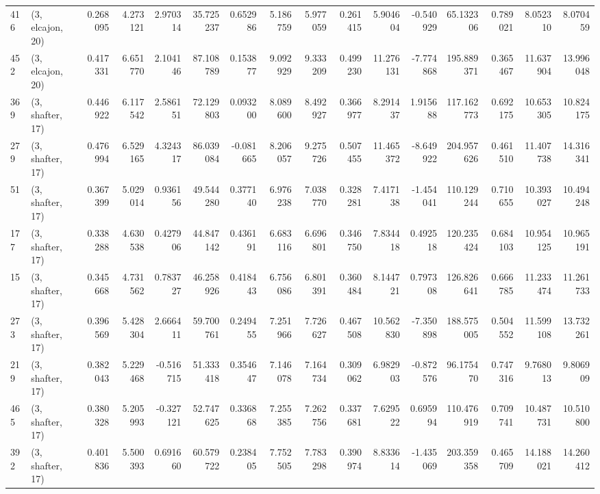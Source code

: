 \begin{tabular}{llrrrrrrrrrrrrrr}
416 &  (3, elcajon, 20) &   0.268095 &   4.273121 &   2.970314 &    35.725237 &   0.652986 &   5.186759 &   5.977059 &  0.261415 &   5.904604 &  -0.540929 &    65.132306 &  0.789021 &   8.052310 &   8.070459 \\
452 &  (3, elcajon, 20) &   0.417331 &   6.651770 &   2.104146 &    87.108789 &   0.153877 &   9.092929 &   9.333209 &  0.499230 &  11.276131 &  -7.774868 &   195.889371 &  0.365467 &  11.637904 &  13.996048 \\
369 &  (3, shafter, 17) &   0.446922 &   6.117542 &   2.586151 &    72.129803 &   0.093200 &   8.089600 &   8.492927 &  0.366977 &   8.291437 &   1.915688 &   117.162773 &  0.692175 &  10.653305 &  10.824175 \\
279 &  (3, shafter, 17) &   0.476994 &   6.529165 &   4.324317 &    86.039084 &  -0.081665 &   8.206057 &   9.275726 &  0.507455 &  11.465372 &  -8.649922 &   204.957626 &  0.461510 &  11.407738 &  14.316341 \\
51  &  (3, shafter, 17) &   0.367399 &   5.029014 &   0.936156 &    49.544280 &   0.377140 &   6.976238 &   7.038770 &  0.328281 &   7.417138 &  -1.454041 &   110.129244 &  0.710655 &  10.393027 &  10.494248 \\
177 &  (3, shafter, 17) &   0.338288 &   4.630538 &   0.427906 &    44.847142 &   0.436191 &   6.683116 &   6.696801 &  0.346750 &   7.834418 &   0.492518 &   120.235424 &  0.684103 &  10.954125 &  10.965191 \\
15  &  (3, shafter, 17) &   0.345668 &   4.731562 &   0.783727 &    46.258926 &   0.418443 &   6.756086 &   6.801391 &  0.360484 &   8.144721 &   0.797308 &   126.826641 &  0.666785 &  11.233474 &  11.261733 \\
273 &  (3, shafter, 17) &   0.396569 &   5.428304 &   2.666411 &    59.700761 &   0.249455 &   7.251966 &   7.726627 &  0.467508 &  10.562830 &  -7.350898 &   188.575005 &  0.504552 &  11.599108 &  13.732261 \\
219 &  (3, shafter, 17) &   0.382043 &   5.229468 &  -0.516715 &    51.333418 &   0.354647 &   7.146078 &   7.164734 &  0.309062 &   6.982903 &  -0.872576 &    96.175470 &  0.747316 &   9.768013 &   9.806909 \\
465 &  (3, shafter, 17) &   0.380328 &   5.205993 &  -0.327121 &    52.747625 &   0.336868 &   7.255385 &   7.262756 &  0.337681 &   7.629522 &   0.695994 &   110.476919 &  0.709741 &  10.487731 &  10.510800 \\
392 &  (3, shafter, 17) &   0.401836 &   5.500393 &   0.691660 &    60.579722 &   0.238405 &   7.752505 &   7.783298 &  0.390974 &   8.833614 &  -1.435069 &   203.359358 &  0.465709 &  14.188021 &  14.260412 \\

\end{tabular}
